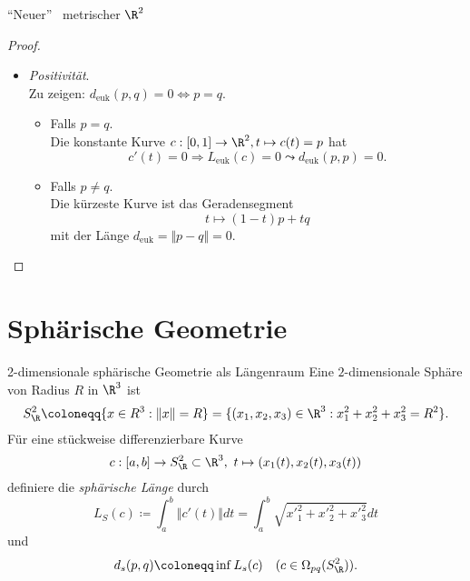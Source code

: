 \begin{theorem}{``Neuer'' \ metrischer $ \R^2 $}
\begin{proof}
\begin{itemize}
      \item \emph{Positivität}. \\
        Zu zeigen: $ d_\text{euk}(p,q) = 0 \Leftrightarrow p = q $.
        \begin{itemize}
          \item Falls $ p = q $. \\
            Die konstante Kurve $ c: [0,1] \to \R^2, t \mapsto c(t) = p $ hat 
            \begin{equation*}
              c'(t) = 0 \Rightarrow L_\text{euk}(c) = 0 \leadsto d_\text{euk}(p,p) = 0 \text{.}
            \end{equation*}
          \item Falls $ p \neq q $. \\
            Die kürzeste Kurve ist das Geradensegment
            \begin{equation*}
              t \mapsto (1-t)p + tq
            \end{equation*}
            mit der Länge $ d_\text{euk} = \Vert p - q \Vert = 0 $.
        \end{itemize}
    \end{itemize}
  \end{proof}
\end{theorem}

\section{Sphärische Geometrie}
\begin{example}{2-dimensionale sphärische Geometrie als Längenraum}
  Eine $ 2 $-dimensionale Sphäre von Radius $ R $ in $ \R^3 $ ist
  \begin{equation*}
    S^2_\R \coloneqq \{ x \in R^3 : \Vert x \Vert = R \} = \{ (x_1, x_2, x_3) \in \R^3 : x_1^2+x_2^2+x_3^2 = R^2 \}\text{.}
  \end{equation*}
  Für eine stückweise differenzierbare Kurve
  \begin{equation*}
    c: [a,b] \to S^2_\R \subset \R^3, \ t \mapsto (x_1(t), x_2(t), x_3(t))
  \end{equation*}
  definiere die \emph{sphärische Länge} durch
  \begin{equation*}
    L_S(c) \coloneqq \int_a^b \Vert c'(t) \Vert dt = \int_a^b \sqrt{{x'}_1^2+{x'}_2^2+{x'}_3^2}dt
  \end{equation*}
  und
  \begin{equation*}
    d_s(p,q) \coloneqq \inf L_s(c) \quad (c \in \Omega_{pq}(S^2_\R))\text{.}
  \end{equation*}
\end{example}

